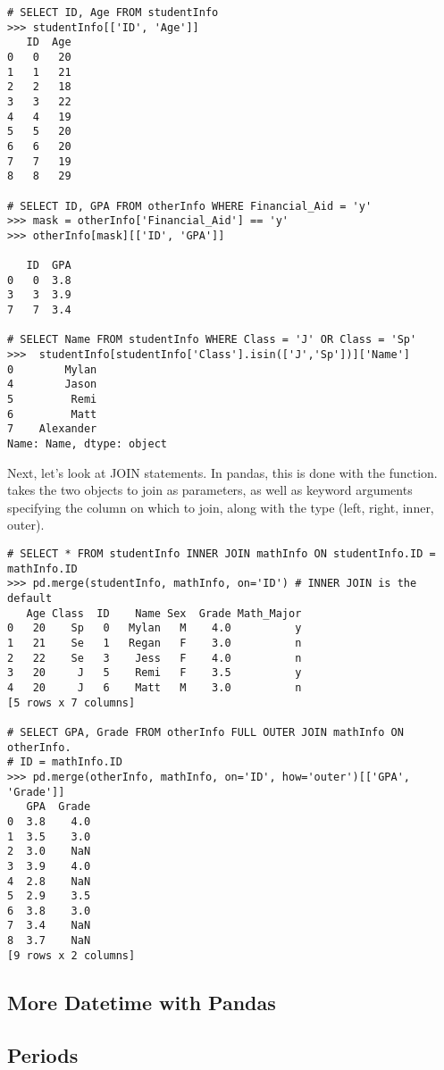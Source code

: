 \begin{lstlisting}
# SELECT ID, Age FROM studentInfo
>>> studentInfo[['ID', 'Age']]
   ID  Age
0   0   20
1   1   21
2   2   18
3   3   22
4   4   19
5   5   20
6   6   20
7   7   19
8   8   29

# SELECT ID, GPA FROM otherInfo WHERE Financial_Aid = 'y'
>>> mask = otherInfo['Financial_Aid'] == 'y'
>>> otherInfo[mask][['ID', 'GPA']]

   ID  GPA
0   0  3.8
3   3  3.9
7   7  3.4

# SELECT Name FROM studentInfo WHERE Class = 'J' OR Class = 'Sp'
>>>  studentInfo[studentInfo['Class'].isin(['J','Sp'])]['Name']
0        Mylan
4        Jason
5         Remi
6         Matt
7    Alexander
Name: Name, dtype: object
\end{lstlisting}

Next, let's look at JOIN statements.
In pandas, this is done with the  function.
 takes the two  objects to join as parameters, as well as keyword arguments specifying
the column on which to join, along with the type (left, right, inner, outer).

\begin{lstlisting}
# SELECT * FROM studentInfo INNER JOIN mathInfo ON studentInfo.ID = mathInfo.ID
>>> pd.merge(studentInfo, mathInfo, on='ID') # INNER JOIN is the default
   Age Class  ID    Name Sex  Grade Math_Major
0   20    Sp   0   Mylan   M    4.0          y
1   21    Se   1   Regan   F    3.0          n
2   22    Se   3    Jess   F    4.0          n
3   20     J   5    Remi   F    3.5          y
4   20     J   6    Matt   M    3.0          n
[5 rows x 7 columns]

# SELECT GPA, Grade FROM otherInfo FULL OUTER JOIN mathInfo ON otherInfo. 
# ID = mathInfo.ID
>>> pd.merge(otherInfo, mathInfo, on='ID', how='outer')[['GPA', 'Grade']]
   GPA  Grade
0  3.8    4.0
1  3.5    3.0
2  3.0    NaN
3  3.9    4.0
4  2.8    NaN
5  2.9    3.5
6  3.8    3.0
7  3.4    NaN
8  3.7    NaN
[9 rows x 2 columns]
\end{lstlisting}

\subsection*{More Datetime with Pandas}
\subsection*{Periods} %

